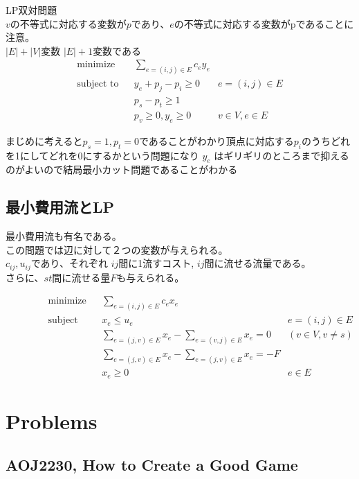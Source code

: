 \documentclass[13pt, a4paper, landscape]{jarticle}
\theoremstyle{nonitalic} %
\begin{document}
LP双対問題 \\
$v$の不等式に対応する変数が$p$であり、$e$の不等式に対応する変数がpであることに注意。\\
$|E|+|V|$変数 $|E|+1$変数である
\begin{align}
 &&&&&\textrm{minimize}   && \sum_{e=(i,j)\in E} c_e y_e  \\
 &&&&&\textrm{subject to} && y_e + p_j - p_i \geq 0 &  e = (i, j) \in E  &&&&&\\
 &&&&&                    && p_s - p_t  \geq 1         &&&&& \\
 &&&&&                    && p_v \geq 0,  y_e \geq 0 &  v \in V, e \in E &&&&&
\end{align}

まじめに考えると$p_s=1, p_t=0$であることがわかり頂点に対応する$p_i$のうちどれを1にしてどれを0にするかという問題になり $y_e$ はギリギリのところまで抑えるのがよいので結局最小カット問題であることがわかる


\subsection{最小費用流とLP}

最小費用流も有名である。 \\
この問題では辺に対して２つの変数が与えられる。 \\
$c_{ij}, u_{ij}$であり、それぞれ $ij$間に1流すコスト, $ij$間に流せる流量である。 \\
さらに、$st$間に流せる量$F$も与えられる。

\begin{align}
 &&&&&\textrm{minimize}   && \sum_{e=(i,j)\in E} c_e x_e  \\
 &&&&&\textrm{subject to} && x_{e} \leq u_e & e = (i,j) \in E \\
 &&&&&                    && \sum_{e = (j,v) \in E} x_e - \sum_{e=(v,j) \in E} x_e= 0 & (v \in V, v\neq s) &&&&& \\
 &&&&&                    && \sum_{e=(j,v) \in E} x_e - \sum_{e=(j,v)\in E} x_e = -F \\
 &&&&&                    && x_e \geq 0 & e \in E &&&&&
\end{align}




\section{Problems}
\subsection{AOJ2230, How to Create a Good Game}
\end{document}
